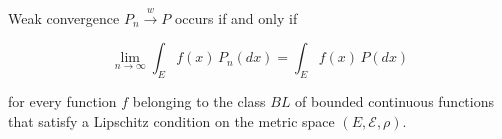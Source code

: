 Weak convergence $P_n \xrightarrow{w} P$ occurs if and only if

$$\lim_{n \to \infty} \int_E f(x) \, P_n(dx) = \int_E f(x) \, P(dx)$$

for every function $f$ belonging to the class $BL$ of bounded continuous functions that satisfy a Lipschitz condition on the metric space $(E, \mathcal{E}, \rho)$.

